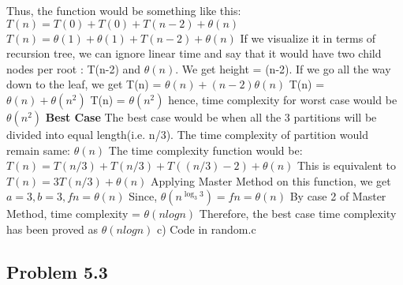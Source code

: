 \documentclass[a4paper,12pt]{article}
\begin{document}
{{Thus, the function would be something like this:\newline
$ T(n) = T(0) + T(0) + T (n-2) +  \theta (n) $ \newline
$ T(n) = \theta(1) + \theta(1) + T(n-2) + \theta(n) $ \newline
If we visualize it in terms of recursion tree, we can ignore linear time and say that it would have two child nodes per root : T(n-2) and $\theta (n) $. We get height = (n-2). If we go all the way down to the leaf, we get\newline
T(n) = $ \theta (n) + (n-2) \theta (n) $ \newline
T(n) = $ \theta(n) + \theta (n^2) $ \newline
T(n) = $\theta (n^2) $ \newline
hence, time complexity for worst case would be  $\theta (n^2) $ \newline
\newline \newline 
\textbf{\newpage Best Case}
\newline The best case would be when all the 3 partitions will be divided into equal length(i.e. n/3).
\newline The time complexity of partition would remain same: $\theta(n)$ \newline
The time complexity function would be:
\newline $ T(n) = T(n/3) + T (n/3) + T((n/3) - 2) + \theta(n) $ \newline
This is equivalent to $ T(n) = 3 T (n/3) + \theta (n) $ \newline
Applying Master Method on this function,
we get $ a = 3, b = 3, fn = \theta (n) $ \newline
Since, $ \theta(n ^ { \log _{3} 3} ) = fn = \theta(n) $ \newline
By case 2 of Master Method, time complexity = $\theta(nlogn)$\newline
Therefore, the best case time complexity has been proved as $\theta(nlogn) $
\newline \newline
c) Code in random.c}}

\subsection*{\newline\newline Problem 5.3}
\end{document}
